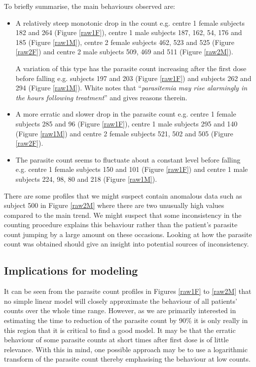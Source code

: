 To briefly summarise, the main behaviours observed are:
\begin{itemize}
\item A relatively steep monotonic drop in the count e.g. centre 1 female subjects 182 and 264 (Figure \ref{raw1F}), centre 1 male subjects 187, 162, 54, 176 and 185 (Figure \ref{raw1M}), centre 2 female subjects 462, 523 and 525 (Figure \ref{raw2F}) and centre 2 male subjects 509, 469 and 511 (Figure \ref{raw2M}).

A variation of this type has the parasite count increasing after the first dose before falling e.g. subjects 197 and 203 (Figure \ref{raw1F}) and subjects 262 and 294 (Figure \ref{raw1M}). White\cite{white} notes that ``\textit{parasitemia may rise alarmingly in the hours following treatment}'' and gives reasons therein.
\item A more erratic and slower drop in the parasite count e.g. centre 1 female subjects 285 and 96 (Figure \ref{raw1F}), centre 1 male subjects 295 and 140 (Figure \ref{raw1M}) and centre 2 female subjects 521, 502 and 505 (Figure \ref{raw2F}). 
\item The parasite count seems to fluctuate about a constant level before falling e.g. centre 1 female subjects 150 and 101 (Figure \ref{raw1F}) and centre 1 male subjects 224, 98, 80 and 218 (Figure \ref{raw1M}). 
\end{itemize}
There are some profiles that we might suspect contain anomalous data such as subject 500 in Figure \ref{raw2M} where there are two unusually high values compared to the main trend. We might suspect that some inconsistency in the counting procedure explains this behaviour rather than the patient's parasite count jumping by a large amount on these occasions. Looking at how the parasite count was obtained should give an insight into potential sources of inconsistency.
\subsection{Implications for modeling}
It can be seen from the parasite count profiles in Figures \ref{raw1F} to \ref{raw2M} that no simple linear model will closely approximate the behaviour of all patients' counts over the whole time range. However, as we are primarily interested in estimating the time to reduction of the parasite count by 90\% it is only really in this region that it is critical to find a good model. It may be that the erratic behaviour of some parasite counts at short times after first dose is of little relevance. With this in mind, one possible approach may be to use a logarithmic transform of the parasite count thereby emphasising the behaviour at low counts.
